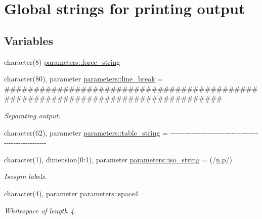 \hypertarget{group__STRINGS}{}\section{Global strings for printing output}
\label{group__STRINGS}
\subsection*{Variables}
\begin{DoxyCompactItemize}
\item 
character(8) \mbox{\hyperlink{group__STRINGS_gaf1698471c98154361a7783b3bd76fc9b}{parameters\+::force\+\_\+string}}
\item 
character(80), parameter \mbox{\hyperlink{group__STRINGS_ga757aedae1ca22891e6971eee77226285}{parameters\+::line\+\_\+break}} = \textquotesingle{}\#\#\#\#\#\#\#\#\#\#\#\#\#\#\#\#\#\#\#\#\#\#\#\#\#\#\#\#\#\#\#\#\#\#\#\#\#\#\#\#\#\#\#\#\#\#\#\#\#\#\#\#\#\#\#\#\#\#\#\#\#\#\#\#\#\#\#\#\#\#\#\#\#\#\#\#\#\#\#\#\textquotesingle{}
\begin{DoxyCompactList}\small\item\em Separating output. \end{DoxyCompactList}\item 
character(62), parameter \mbox{\hyperlink{group__STRINGS_ga4074473b9d6e05d0b912b06d42301755}{parameters\+::table\+\_\+string}} = \textquotesingle{}-\/-\/-\/-\/-\/-\/-\/-\/-\/-\/-\/-\/-\/-\/-\/-\/-\/-\/-\/-\/-\/-\/-\/-\/-\/-\/-\/-\/+-\/-\/-\/-\/-\/-\/-\/-\/-\/-\/-\/-\/-\/-\/-\/-\/-\/-\/-\/-\/-\/-\/-\/-\/-\/\textquotesingle{}
\item 
character(1), dimension(0\+:1), parameter \mbox{\hyperlink{group__STRINGS_gaa642f410416bdb397b62d3844df96d6c}{parameters\+::iso\+\_\+string}} = (/\textquotesingle{}\mbox{\hyperlink{group__INPUT__PARS_ga2e69dbce49f3e83688fe80de2ce83724}{n}}\textquotesingle{},\textquotesingle{}p\textquotesingle{}/)
\begin{DoxyCompactList}\small\item\em Isospin labels. \end{DoxyCompactList}\item 
character(4), parameter \mbox{\hyperlink{group__STRINGS_ga0f73a365fff78bef9c51e7b776ab6184}{parameters\+::space4}} = \textquotesingle{} \textquotesingle{}
\begin{DoxyCompactList}\small\item\em Whitespace of length 4. \end{DoxyCompactList}\end{DoxyCompactItemize}


